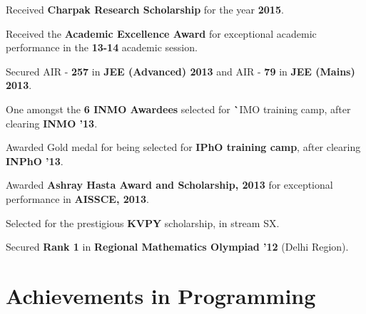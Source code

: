 \documentclass[a4paper]{norm-resume} %
\begin{document}
\begin{tightitemize}
	\item Received \textbf{Charpak Research Scholarship} for the year \textbf{2015}.
	\item Received the \textbf{Academic Excellence Award} for exceptional academic performance in the \textbf{13-14} academic session.
	\item Secured AIR - \textbf{257} in {\textbf{JEE (Advanced) 2013}} and AIR - {\textbf{79}} in \textbf{JEE (Mains) 2013}.
	\item One amongst the \textbf{6 INMO Awardees} selected for \textbf`{IMO training camp}, after clearing \textbf{INMO '13}.
	\item Awarded Gold medal for being selected for \textbf{IPhO training camp}, after clearing \textbf{INPhO '13}.
	\item Awarded \textbf{Ashray Hasta Award and Scholarship, 2013} for exceptional performance in \textbf{AISSCE, 2013}.
	\item Selected for the prestigious \textbf{KVPY} scholarship, in stream SX.
	\item Secured \textbf{Rank 1} in \textbf{Regional Mathematics Olympiad '12} (Delhi Region).	
\end{tightitemize}
	
\vspace{0mm}	%


\section{Achievements in Programming}

\vspace{3mm} %
\end{document}
